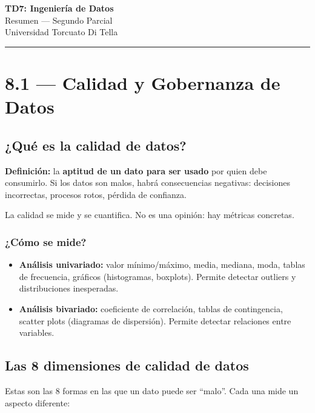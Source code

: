 \documentclass[11pt, a4paper]{article}
\begin{document}
\begin{center}
	{\LARGE\bfseries\color{teal} TD7: Ingeniería de Datos}\\[0.4em]
	{\large Resumen — Segundo Parcial}\\[0.2em]
	{\small Universidad Torcuato Di Tella}
\end{center}

\vspace{0.5em}
\hrule
\vspace{1em}

\section{8.1 — Calidad y Gobernanza de Datos}

\subsection{¿Qué es la calidad de datos?}

\textbf{Definición:} la \textbf{aptitud de un dato para ser usado} por quien debe consumirlo. Si los datos son malos, habrá consecuencias negativas: decisiones incorrectas, procesos rotos, pérdida de confianza.

La calidad se mide y se cuantifica. No es una opinión: hay métricas concretas.

\subsubsection{¿Cómo se mide?}
\begin{itemize}
	\item \textbf{Análisis univariado:} valor mínimo/máximo, media, mediana, moda, tablas de frecuencia, gráficos (histogramas, boxplots). Permite detectar outliers y distribuciones inesperadas.
	\item \textbf{Análisis bivariado:} coeficiente de correlación, tablas de contingencia, scatter plots (diagramas de dispersión). Permite detectar relaciones entre variables.
\end{itemize}

\subsection{Las 8 dimensiones de calidad de datos}

Estas son las 8 formas en las que un dato puede ser ``malo''. Cada una mide un aspecto diferente:
\end{document}
